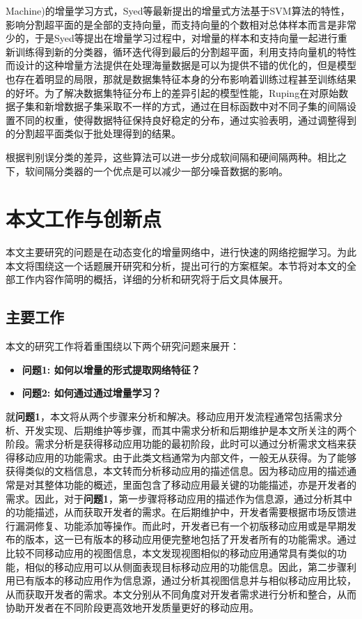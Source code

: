 Machine)的增量学习方式，Syed等\cite{syed1999incremental}最新提出的增量式方法基于SVM算法的特性，影响分割超平面的是全部的支持向量，而支持向量的个数相对总体样本而言是非常少的，于是Syed等提出在增量学习过程中，对增量的样本和支持向量一起进行重新训练得到新的分类器，循环迭代得到最后的分割超平面，利用支持向量机的特性而设计的这种增量方法提供在处理海量数据是可以为提供不错的优化的，但是模型也存在着明显的局限，那就是数据集特征本身的分布影响着训练过程甚至训练结果的好坏。为了解决数据集特征分布上的差异引起的模型性能，Ruping\cite{ruping2001incremental}在对原始数据子集和新增数据子集采取不一样的方式，通过在目标函数中对不同子集的间隔设置不同的权重，使得数据特征保持良好稳定的分布，通过实验表明，通过调整得到的分割超平面类似于批处理得到的结果。

根据判别误分类的差异，这些算法可以进一步分成软间隔和硬间隔两种。相比之下，软间隔分类器的一个优点是可以减少一部分噪音数据的影响\cite{kivinen2002large}。



\section{本文工作与创新点}
本文主要研究的问题是在动态变化的增量网络中，进行快速的网络挖掘学习。为此本文将围绕这一个话题展开研究和分析，提出可行的方案框架。本节将对本文的全部工作内容作简明的概括，详细的分析和研究将于后文具体展开。


\subsection{主要工作}
本文的研究工作将着重围绕以下两个研究问题来展开：
\begin{itemize}
\item \textbf{问题1: 如何以增量的形式提取网络特征？}
\item \textbf{问题2: 如何通过通过增量学习？}
\end{itemize}

就\textbf{问题1}，本文将从两个步骤来分析和解决。移动应用开发流程通常包括需求分析、开发实现、后期维护等步骤，而其中需求分析和后期维护是本文所关注的两个阶段。需求分析是获得移动应用功能的最初阶段，此时可以通过分析需求文档来获得移动应用的功能需求。由于此类文档通常为内部文件，一般无从获得。为了能够获得类似的文档信息，本文转而分析移动应用的描述信息。因为移动应用的描述通常是对其整体功能的概述，里面包含了移动应用最关键的功能描述，亦是开发者的需求。因此，对于\textbf{问题1}，第一步骤将移动应用的描述作为信息源，通过分析其中的功能描述，从而获取开发者的需求。在后期维护中，开发者需要根据市场反馈进行漏洞修复、功能添加等操作。而此时，开发者已有一个初版移动应用或是早期发布的版本，这一已有版本的移动应用便完整地包括了开发者所有的功能需求。通过比较不同移动应用的视图信息，本文发现视图相似的移动应用通常具有类似的功能，相似的移动应用可以从侧面表现目标移动应用的功能信息。因此，第二步骤利用已有版本的移动应用作为信息源，通过分析其视图信息并与相似移动应用比较，从而获取开发者的需求。本文分别从不同角度对开发者需求进行分析和整合，从而协助开发者在不同阶段更高效地开发质量更好的移动应用。

